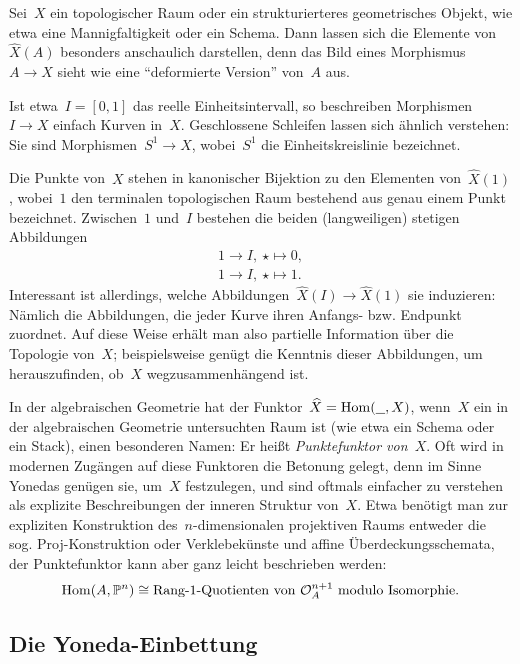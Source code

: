 Sei~$X$ ein topologischer Raum oder ein strukturierteres geometrisches
Objekt, wie etwa eine Mannigfaltigkeit oder ein Schema. Dann lassen sich die Elemente
von~$\widehat X(A)$ besonders anschaulich darstellen, denn das Bild eines
Morphismus~$A \to X$ sieht wie eine "`deformierte Version"' von~$A$ aus.

Ist etwa~$I = [0,1]$ das reelle Einheitsintervall, so beschreiben Morphismen~$I
\to X$ einfach Kurven in~$X$. Geschlossene Schleifen lassen sich ähnlich
verstehen: Sie sind Morphismen~$S^1 \to X$, wobei~$S^1$ die Einheitskreislinie
bezeichnet.

Die Punkte von~$X$ stehen in kanonischer Bijektion zu den Elementen
von~$\widehat X(1)$, wobei~$1$ den terminalen topologischen Raum bestehend aus
genau einem Punkt bezeichnet. Zwischen~$1$ und~$I$ bestehen die beiden
(langweiligen) stetigen Abbildungen
\begin{align*}
  1 \longrightarrow I,\ \star \longmapsto 0, \\
  1 \longrightarrow I,\ \star \longmapsto 1.
\end{align*}
Interessant ist allerdings, welche Abbildungen~$\widehat X(I) \to \widehat X(1)$
sie induzieren: Nämlich die Abbildungen, die jeder Kurve ihren Anfangs- bzw.
Endpunkt zuordnet. Auf diese Weise erhält man also partielle Information über
die Topologie von~$X$; beispielsweise genügt die Kenntnis dieser Abbildungen,
um herauszufinden, ob~$X$ wegzusammenhängend ist.


\begin{bem}In der algebraischen Geometrie hat der Funktor~$\widehat X =
\mathrm{Hom}(\underline{\ \ },X)$, wenn~$X$ ein in der algebraischen Geometrie untersuchten
Raum ist (wie etwa ein Schema oder ein Stack), einen besonderen Namen: Er heißt
\emph{Punktefunktor von~$X$}. Oft wird in modernen Zugängen auf diese Funktoren
die Betonung gelegt, denn im Sinne Yonedas genügen sie, um~$X$
festzulegen, und sind oftmals einfacher zu verstehen als explizite
Beschreibungen der inneren Struktur von~$X$. Etwa benötigt man zur expliziten
Konstruktion des~$n$-dimensionalen projektiven Raums entweder die sog.
Proj-Konstruktion oder Verklebekünste und affine Überdeckungsschemata, der
Punktefunktor kann aber ganz leicht beschrieben werden:
\[ \mathrm{Hom}(A, \mathbb{P}^n) \cong \text{Rang-1-Quotienten von~$\mathcal{O}_A^{n+1}$ modulo
Isomorphie}. \]
\end{bem}


\subsection{Die Yoneda-Einbettung}

